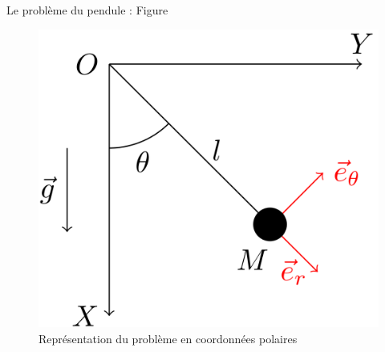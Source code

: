 \documentclass[xcolor=table]{beamer}
\begin{document}
\begin{frame}{Le problème du pendule : Figure}
    \begin{figure}[h]
    \centering
    \includegraphics[scale = 0.4]{Images/Pendule}
    \caption{Représentation du problème en coordonnées polaires}
\end{figure}
\end{frame}
\end{document}
